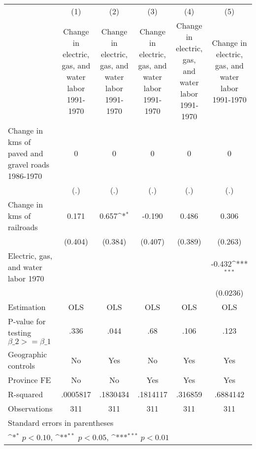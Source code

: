 {
\def\sym#1{\ifmmode^{#1}\else\(^{#1}\)\fi}
\begin{tabular}{l*{5}{c}}
\hline\hline
                    &\multicolumn{1}{c}{(1)}&\multicolumn{1}{c}{(2)}&\multicolumn{1}{c}{(3)}&\multicolumn{1}{c}{(4)}&\multicolumn{1}{c}{(5)}\\
                    &\multicolumn{1}{c}{Change in electric, gas, and water labor 1991-1970}&\multicolumn{1}{c}{Change in electric, gas, and water labor 1991-1970}&\multicolumn{1}{c}{Change in electric, gas, and water labor 1991-1970}&\multicolumn{1}{c}{Change in electric, gas, and water labor 1991-1970}&\multicolumn{1}{c}{Change in electric, gas, and water labor 1991-1970}\\
\hline
Change in kms of paved and gravel roads 1986-1970&           0         &           0         &           0         &           0         &           0         \\
                    &         (.)         &         (.)         &         (.)         &         (.)         &         (.)         \\
[1em]
Change in kms of railroads&       0.171         &       0.657\sym{*}  &      -0.190         &       0.486         &       0.306         \\
                    &     (0.404)         &     (0.384)         &     (0.407)         &     (0.389)         &     (0.263)         \\
[1em]
Electric, gas, and water labor 1970&                     &                     &                     &                     &      -0.432\sym{***}\\
                    &                     &                     &                     &                     &    (0.0236)         \\
\hline
Estimation          &         OLS         &         OLS         &         OLS         &         OLS         &         OLS         \\
P-value for testing $\beta\_2 >= \beta\_1$&        .336         &        .044         &         .68         &        .106         &        .123         \\
Geographic controls &          No         &         Yes         &          No         &         Yes         &         Yes         \\
Province FE         &          No         &          No         &         Yes         &         Yes         &         Yes         \\
R-squared           &    .0005817         &    .1830434         &    .1814117         &     .316859         &    .6884142         \\
Observations        &         311         &         311         &         311         &         311         &         311         \\
\hline\hline
\multicolumn{6}{l}{\footnotesize Standard errors in parentheses}\\
\multicolumn{6}{l}{\footnotesize \sym{*} \(p<0.10\), \sym{**} \(p<0.05\), \sym{***} \(p<0.01\)}\\
\end{tabular}
}

